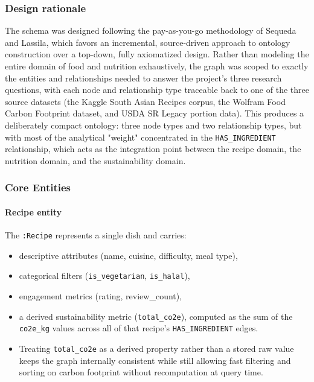 \documentclass{article}
\begin{document}
\subsubsection{Design rationale}
The schema was designed following the pay-as-you-go methodology of Sequeda and Lassila, which favors an incremental, source-driven approach to ontology construction over a top-down, fully axiomatized design. Rather than modeling the entire domain of food and nutrition exhaustively, the graph was scoped to exactly the entities and relationships needed to answer the project's three research questions, with each node and relationship type traceable back to one of the three source datasets (the Kaggle South Asian Recipes corpus, the Wolfram Food Carbon Footprint dataset, and USDA SR Legacy portion data).
This produces a deliberately compact ontology: three node types and two relationship types, but with most of the analytical "weight" concentrated in the \texttt{HAS\_INGREDIENT}
 relationship, which acts as the integration point between the recipe domain, the nutrition domain, and the sustainability domain.

\subsubsection{Core Entities}
\paragraph{Recipe entity}
The \texttt{:Recipe} represents a single dish and carries:
\begin{itemize}
    \item descriptive attributes (name, cuisine, difficulty, meal type),
    \item categorical filters (\texttt{is\_vegetarian}, \texttt{is\_halal}),
    \item engagement metrics (rating, review\_count),
    \item a derived sustainability metric (\texttt{total\_co2e}), computed as the sum of the \texttt{co2e\_kg} values across all of that recipe's \texttt{HAS\_INGREDIENT} edges.
    \item Treating \texttt{total\_co2e} as a derived property rather than a stored raw value keeps the graph internally consistent while still allowing fast filtering and sorting on carbon footprint without recomputation at query time.

\end{itemize}
\end{document}
